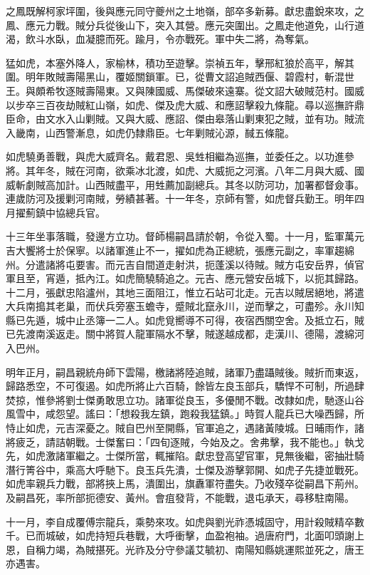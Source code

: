\begin{pinyinscope}
之鳳既解柯家坪圍，後與應元同守夔州之土地嶺，部卒多新募。獻忠盡銳來攻，之鳳、應元力戰。賊分兵從後山下，突入其營。應元突圍出。之鳳走他道免，山行道渴，飲斗水臥，血凝臆而死。踰月，令亦戰死。軍中失二將，為奪氣。

猛如虎，本塞外降人，家榆林，積功至遊擊。崇禎五年，擊邢紅狼於高平，解其圍。明年敗賊壽陽黑山，覆姬關鎖軍。已，從曹文詔追賊西偃、碧霞村，斬混世王。與頗希牧逐賊壽陽東。又與陳國威、馬傑破來遠寨。從文詔大破賊范村。國威以步卒三百夜劫賊紅山嶺，如虎、傑及虎大威、和應詔擊殺九條龍。尋以巡撫許鼎臣命，由文水入山剿賊。又與大威、應詔、傑由皋落山剿東犯之賊，並有功。賊流入畿南，山西警漸息，如虎仍隸鼎臣。七年剿賊沁源，馘五條龍。

如虎驍勇善戰，與虎大威齊名。戴君恩、吳甡相繼為巡撫，並委任之。以功進參將。其年冬，賊在河南，欲乘冰北渡，如虎、大威扼之河濱。八年二月與大威、國威斬劇賊高加計。山西賊盡平，用甡薦加副總兵。其冬以防河功，加署都督僉事。連歲防河及援剿河南賊，勞績甚著。十一年冬，京師有警，如虎督兵勤王。明年四月擢薊鎮中協總兵官。

十三年坐事落職，發邊方立功。督師楊嗣昌請於朝，令從入蜀。十一月，監軍萬元吉大饗將士於保寧。以諸軍進止不一，擢如虎為正總統，張應元副之，率軍趨綿州。分遣諸將屯要害。而元吉自間道走射洪，扼蓬溪以待賊。賊方屯安岳界，偵官軍且至，宵遁，抵內江。如虎簡驍騎追之。元吉、應元營安岳城下，以扼其歸路。十二月，張獻忠陷瀘州，其地三面阻江，惟立石站可北走。元吉以賊居絕地，將遣大兵南搗其老巢，而伏兵旁塞玉蟾寺，蹙賊北竄永川，逆而擊之，可盡殄。永川知縣已先遁，城中止丞簿一二人。如虎覓嚮導不可得，夜宿西關空舍。及抵立石，賊已先渡南溪返走。關中將賀人龍軍隔水不擊，賊遂越成都，走漢川、德陽，渡綿河入巴州。

明年正月，嗣昌親統舟師下雲陽，檄諸將陸追賊，諸軍乃盡躡賊後。賊折而東返，歸路悉空，不可復遏。如虎所將止六百騎，餘皆左良玉部兵，驕悍不可制，所過肆焚掠，惟參將劉士傑勇敢思立功。諸軍從良玉，多優閒不戰。改隸如虎，馳逐山谷風雪中，咸怨望。謠曰：「想殺我左鎮，跑殺我猛鎮。」時賀人龍兵已大噪西歸，所恃止如虎，元吉深憂之。賊自巴州至開縣，官軍追之，遇諸黃陵城。日晡雨作，諸將疲乏，請詰朝戰。士傑奮曰：「四旬逐賊，今始及之。舍弗擊，我不能也。」執戈先，如虎激諸軍繼之。士傑所當，輒摧陷。獻忠登高望官軍，見無後繼，密抽壯騎潛行箐谷中，乘高大呼馳下。良玉兵先潰，士傑及游擊郭開、如虎子先捷並戰死。如虎率親兵力戰，部將挾上馬，潰圍出，旗纛軍符盡失。乃收殘卒從嗣昌下荊州。及嗣昌死，率所部扼德安、黃州。會疽發背，不能戰，退屯承天，尋移駐南陽。

十一月，李自成覆傅宗龍兵，乘勢來攻。如虎與劉光祚憑城固守，用計殺賊精卒數千。已而城破，如虎持短兵巷戰，大呼衝擊，血盈袍袖。過唐府門，北面叩頭謝上恩，自稱力竭，為賊揕死。光祚及分守參議艾毓初、南陽知縣姚運熙並死之，唐王亦遇害。


\end{pinyinscope}

